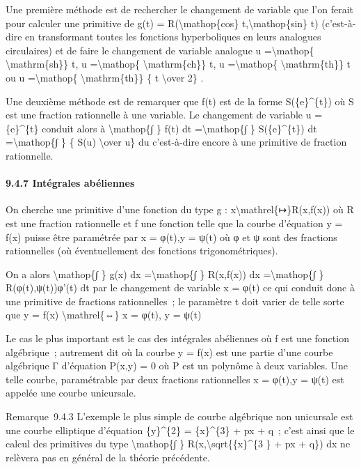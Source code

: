 \documentclass[]{article}
\begin{document}
Une première méthode est de rechercher le changement de variable que
l'on ferait pour calculer une primitive de g(t) =
R(\textbackslash{}mathop\{cos\} t,\textbackslash{}mathop\{sin\} t)
(c'est-à-dire en transformant toutes les fonctions hyperboliques en
leurs analogues circulaires) et de faire le changement de variable
analogue u =\textbackslash{}mathop\{ \textbackslash{}mathrm\{sh\}\} t, u
=\textbackslash{}mathop\{ \textbackslash{}mathrm\{ch\}\} t, u
=\textbackslash{}mathop\{ \textbackslash{}mathrm\{th\}\} t ou u
=\textbackslash{}mathop\{ \textbackslash{}mathrm\{th\}\} \{ t
\textbackslash{}over 2\} .

Une deuxième méthode est de remarquer que f(t) est de la forme
S(\{e\}\^{}\{t\}) où S est une fraction rationnelle à une variable. Le
changement de variable u = \{e\}\^{}\{t\} conduit alors à
\textbackslash{}mathop\{∫ \} f(t) dt =\textbackslash{}mathop\{∫ \}
S(\{e\}\^{}\{t\}) dt =\textbackslash{}mathop\{∫ \} \{ S(u)
\textbackslash{}over u\} du c'est-à-dire encore à une primitive de
fraction rationnelle.

\paragraph{9.4.7 Intégrales abéliennes}

On cherche une primitive d'une fonction du type g :
x\textbackslash{}mathrel\{↦\}R(x,f(x)) où R est une fraction rationnelle
et f une fonction telle que la courbe d'équation y = f(x) puisse être
paramétrée par x = φ(t),y = ψ(t) où φ et ψ sont des fractions
rationnelles (où éventuellement des fonctions trigonométriques).

On a alors \textbackslash{}mathop\{∫ \} g(x) dx
=\textbackslash{}mathop\{∫ \} R(x,f(x)) dx =\textbackslash{}mathop\{∫ \}
R(φ(t),ψ(t))φ'(t) dt par le changement de variable x = φ(t) ce qui
conduit donc à une primitive de fractions rationnelles~; le paramètre t
doit varier de telle sorte que y = f(x) \textbackslash{}mathrel\{⇔\} x =
φ(t), y = ψ(t)

Le cas le plus important est le cas des intégrales abéliennes où f est
une fonction algébrique~; autrement dit où la courbe y = f(x) est une
partie d'une courbe algébrique Γ d'équation P(x,y) = 0 où P est un
polynôme à deux variables. Une telle courbe, paramétrable par deux
fractions rationnelles x = φ(t),y = ψ(t) est appelée une courbe
unicursale.

Remarque~9.4.3 L'exemple le plus simple de courbe algébrique non
unicursale est une courbe elliptique d'équation \{y\}\^{}\{2\} =
\{x\}\^{}\{3\} + px + q~; c'est ainsi que le calcul des primitives du
type \textbackslash{}mathop\{∫ \} R(x,\textbackslash{}sqrt\{\{x\}\^{}\{3
\} + px + q\}) dx ne relèvera pas en général de la théorie précédente.
\end{document}
